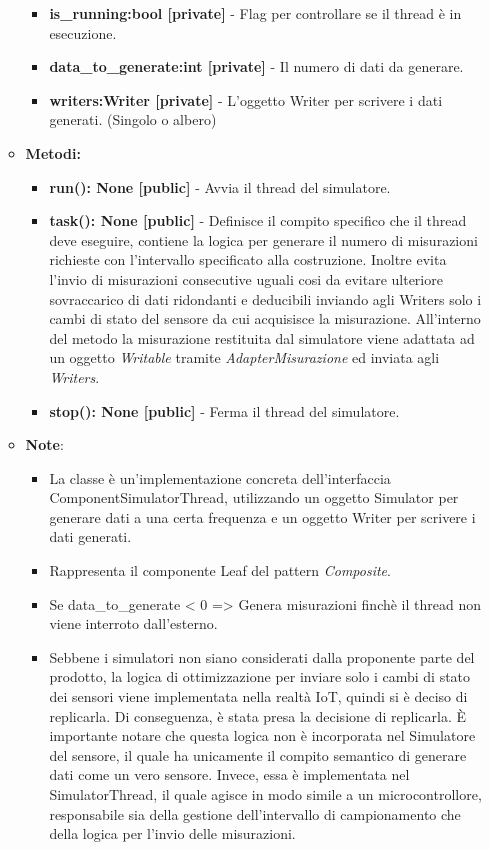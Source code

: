 \begin{itemize}
\begin{itemize}
\begin{itemize}
            \item \textbf{is\_running:bool [private]} - Flag per controllare se il thread è in esecuzione.
            \item \textbf{data\_to\_generate:int [private]} - Il numero di dati da generare.
            \item \textbf{writers:Writer [private]} - L'oggetto Writer per scrivere i dati generati. (Singolo o albero)
        \end{itemize}
        \item \textbf{Metodi: }
        \begin{itemize}
            \item \textbf{run(): None [public]} - Avvia il thread del simulatore.
            \item \textbf{task(): None [public]} - Definisce il compito specifico che il thread deve eseguire, contiene la logica per generare il numero di misurazioni richieste con l'intervallo specificato alla costruzione.
            Inoltre evita l'invio di misurazioni consecutive uguali cosi da evitare ulteriore sovraccarico di dati ridondanti e deducibili inviando agli Writers solo i cambi di stato del sensore da cui acquisisce la misurazione.
            All'interno del metodo la misurazione restituita dal simulatore viene adattata ad un oggetto \textit{Writable} tramite \textit{AdapterMisurazione} ed inviata agli \textit{Writers}.
            \item \textbf{stop(): None [public]} - Ferma il thread del simulatore.
        \end{itemize}
        \item\textbf{Note}:
        \begin{itemize}
            \item La classe è un'implementazione concreta dell'interfaccia ComponentSimulatorThread, utilizzando un oggetto Simulator per generare dati a una certa frequenza e un oggetto Writer per scrivere i dati generati.
            \item Rappresenta il componente Leaf del pattern \textit{Composite}.
            \item Se data\_to\_generate < 0 => Genera misurazioni finchè il thread non viene interroto dall'esterno.
            \item Sebbene i simulatori non siano considerati dalla proponente parte del prodotto, la logica di ottimizzazione per inviare solo i cambi di stato dei sensori viene implementata nella realtà IoT, quindi si è deciso di replicarla. Di conseguenza, è stata presa la decisione di replicarla. È importante notare che questa logica non è incorporata nel Simulatore del sensore, il quale ha unicamente il compito semantico di generare dati come un vero sensore. Invece, essa è implementata nel SimulatorThread, il quale agisce in modo simile a un microcontrollore, responsabile sia della gestione dell'intervallo di campionamento che della logica per l'invio delle misurazioni.

\end{itemize}
\end{itemize}
\end{itemize}
